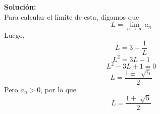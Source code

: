 \documentclass[12pt]{article}
\newenvironment{solucion}
{\begin{mdframed}[backgroundcolor=black!10]
		{\bf Solución:}\\
	}
	{
	\end{mdframed}
}
\newenvironment{preguntas}
{\begin{enumerate}\itemsep12pt
	}
	{
	\end{enumerate}
}
\newcommand{\ra}{\rightarrow}
\begin{document}
\begin{preguntas}
\begin{solucion}
Para calcular el límite de esta, digamos que
$$L = \lim\limits_{n \ra \infty} a_n$$
Luego,
$$L = 3 - \dfrac{1}{L}$$
$$L^2 = 3L - 1$$
$$L^2 - 3L + 1 = 0$$
$$L = \dfrac{1\pm\ \sqrt[]{5}}{2}$$
Pero $a_n > 0$, por lo que
$$L = \dfrac{1 + \sqrt[]{5}}{2}$$

\end{solucion}
\end{preguntas}
\end{document}
